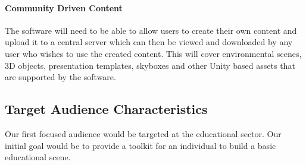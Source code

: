 		\paragraph{Community Driven Content}

		The software will need to be able to allow users to create their own content and upload it to a central server which can then be viewed and downloaded by any user who wishes to use the created content.
		This will cover environmental scenes, 3D objects, presentation templates, skyboxes and other Unity based assets that are supported by the software.

\subsection{Target Audience Characteristics}

	Our first focused audience would be targeted at the educational sector. Our initial goal would be to provide a toolkit for an individual to build a basic educational scene.

